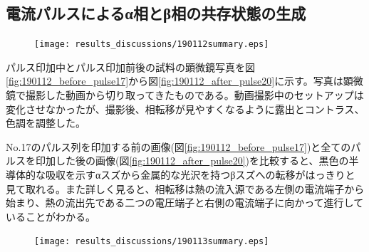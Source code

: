 \subsection{電流パルスによるα相とβ相の共存状態の生成}

\begin{landscape}
\begin{figure}[!h]
    \begin{center}
   \texttt{[image: results\_discussions/190112summary.eps]}
  \end{center}
    \caption{}
  \label{fig:190112summary}
\end{figure}
\end{landscape}

パルス印加中とパルス印加前後の試料の顕微鏡写真を図\ref{fig:190112_before_pulse17}から図\ref{fig:190112_after_pulse20}に示す。写真は顕微鏡で撮影した動画から切り取ってきたものである。動画撮影中のセットアップは変化させなかったが、撮影後、相転移が見やすくなるように露出とコントラス、色調を調整した。

No.17のパルス列を印加する前の画像(図\ref{fig:190112_before_pulse17})と全てのパルスを印加した後の画像(図\ref{fig:190112_after_pulse20})を比較すると、黒色の半導体的な吸収を示すαスズから金属的な光沢を持つβスズへの転移がはっきりと見て取れる。また詳しく見ると、相転移は熱の流入源である左側の電流端子から始まり、熱の流出先である二つの電圧端子と右側の電流端子に向かって進行していることがわかる。

\begin{landscape}
\begin{figure}[!h]
    \begin{center}
   \texttt{[image: results\_discussions/190113summary.eps]}
  \end{center}
    \caption{}
  \label{fig:190113summary}
\end{figure}
\end{landscape}




\clearpage

